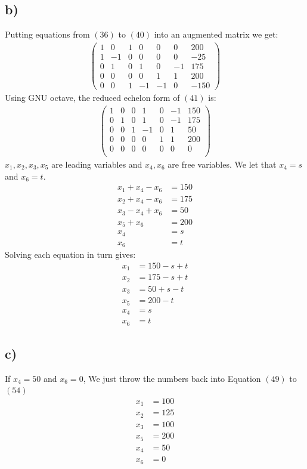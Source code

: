 \documentclass[12pt]{article}
\begin{document}
\subsection{b)}
Putting equations from $(36)$ to $(40)$ into an augmented matrix we get:
\begin{align}
\left(\begin{array}{cccccc|c}
1 & 0 & 1 & 0 & 0 & 0 & 200 \\
1 & -1 & 0 & 0 & 0 & 0 & -25 \\
0 & 1 & 0 & 1 & 0 & -1 & 175 \\
0 & 0 & 0 & 0 & 1 & 1 & 200\\
0 & 0 & 1 & -1 & -1 & 0 & -150
\end{array}\right)
\end{align}
\newpage
Using GNU octave, the reduced echelon form of $(41)$ is:
\begin{align}
\left(\begin{array}{cccccc|c}
     1  &   0  &   0  &   1  &   0  &  -1 &  150 \\
     0  &   1  &   0  &   1  &   0  &  -1 &  175 \\ 
     0  &   0  &   1  &  -1  &   0  &   1 &  50 \\
     0  &   0  &   0  &   0  &   1  &   1 &  200 \\
     0  &   0  &   0  &   0  &   0  &   0 &  0 \\ 
\end{array}\right)
\end{align}
$x_1,x_2,x_3,x_5$ are leading variables and $x_4,x_6$ are free variables.
We let that $x_4 = s$ and $x_6 = t$.
\begin{align}
x_1+x_4-x_6&=150 \\
x_2+x_4-x_6&=175 \\
x_3-x_4+x_6&=50 \\
x_5+x_6&=200 \\
x_4&=s \\
x_6&=t
\end{align}
Solving each equation in turn gives:
\begin{align}
x_1&=150-s+t \\
x_2&=175-s+t \\
x_3&=50+s-t \\
x_5&=200-t \\
x_4&=s \\
x_6&=t
\end{align}
\subsection{c)}
If $x_4=50$ and $x_6 = 0$, We just throw the numbers back into Equation $(49)$ to $(54)$
\begin{align*}
x_1&=100 \\
x_2&=125 \\
x_3&=100 \\
x_5&=200 \\
x_4&=50 \\
x_6&=0
\end{align*}
\end{document}
